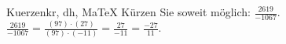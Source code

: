 \begin{MAufgabe}{Kuerzen}{kr, dh, MaTeX}
K\"urzen Sie soweit m\"oglich: $\frac{2619}{-1067}$.\\ 
\ifLsg\MLoesung
\quad $\frac{2619}{-1067}=\frac{(97)\cdot(27)}{(97)\cdot(-11)}=\frac{27}{-11}=\frac{-27}{11}$.\else\relax\fi
 \end{MAufgabe}